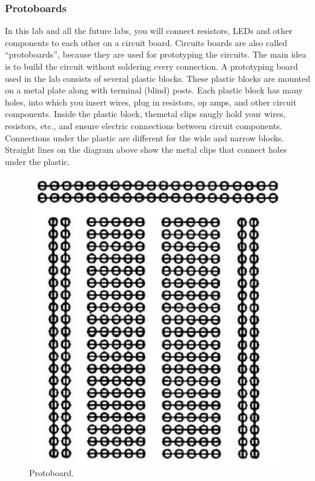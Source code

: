 \documentclass{article}
\begin{document}
\subsubsection{Protoboards}
In this lab and all the future labs, you will connect resistors, LEDs and other components to each other on a circuit board. Circuits boards are also called “protoboards”, because they are used for prototyping the circuits.  The main idea is to build the circuit without soldering every connection. A prototyping board used in the lab consists of several plastic blocks. These plastic blocks are mounted on a metal plate along with terminal (blind) posts. Each plastic block has many holes, into which you insert wires, plug in resistors, op amps, and other circuit components. Inside the plastic block, themetal clips snugly hold your wires, resistors, etc., and ensure electric connections between circuit components. Connections under the plastic are different for the wide and narrow blocks. Straight lines on the diagram above show the metal clips that connect holes under the plastic.
\begin{figure}[H]\centering
\includegraphics[scale=0.2]{board.png}
\caption{Protoboard.}\label{figProto}
\end{figure}
\end{document}
